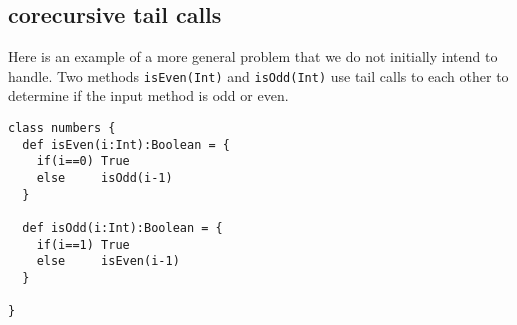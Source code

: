 \subsection{corecursive tail calls}
\label{sec:corecursionexample}

Here is an example of a more general problem that we do not initially intend to handle. Two methods \texttt{isEven(Int)} and \texttt{isOdd(Int)} use tail calls to each other to determine if the input method is odd or even.

\begin{lstlisting}
class numbers {
  def isEven(i:Int):Boolean = {
    if(i==0) True
    else     isOdd(i-1)
  }
  
  def isOdd(i:Int):Boolean = {
    if(i==1) True
    else     isEven(i-1)
  }
  
}
\end{lstlisting}


